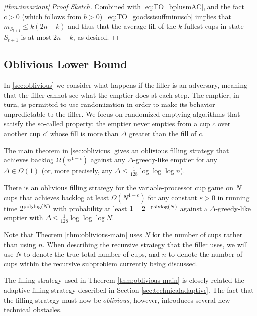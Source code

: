 \begin{proof}[\cref{thm:invariant} Proof Sketch]
Combined with \eqref{eq:TO_bplusmAC}, and the fact $c>0$ (which follows from $b > 0$),
\eqref{eq:TO_goodsstsuffminuscb} implies that $m_{S_{t + 1}} \le k(2n - k)$ and thus that the average fill of
the $k$ fullest cups in state $S_{t+1}$ is at most $2n-k$, as
desired.
\end{proof}
\subsection{Oblivious Lower Bound}

In \cref{sec:oblivious} we consider what happens if the filler is an
 adversary, meaning that the filler cannot see what
the emptier does at each step. The emptier, in turn, is permitted to
use randomization in order to make its behavior unpredictable to the
filler. We focus on randomized emptying algorithms that satisfy the
so-called  property: the emptier never
empties from a cup $c$ over another cup $c'$ whose fill is more than
$\Delta$ greater than the fill of $c$.

The main theorem in \cref{sec:oblivious} gives an oblivious filling
strategy that achieves backlog $\Omega(n^{1 - \epsilon})$ against any
$\Delta$-greedy-like emptier for any $\Delta \in \Omega(1)$ (or, more
precisely, any $\Delta \le \frac{1}{128} \log \log \log n$).

\begin{theorem}
  There is an oblivious filling strategy for the
  variable-processor cup game on $N$ cups that achieves backlog
  at least $\Omega(N^{1-\varepsilon})$ for any constant $\varepsilon
  >0$ in running time $2^{\operatorname{\text{polylog}}(N)}$ with probability at least
  $1-2^{-\operatorname{\text{polylog}}(N)}$ against a $\Delta$-greedy-like emptier
  with $\Delta \le \frac{1}{128} \log\log\log N$.
  \label{thm:oblivious-main}
\end{theorem}

Note that Theorem \ref{thm:oblivious-main} uses $N$ for the number of
cups rather than using $n$. When describing the recursive strategy
that the filler uses, we will use $N$ to denote the true total number
of cups, and $n$ to denote the number of cups within the recursive
subproblem currently being discussed.

The filling strategy used in Theorem \ref{thm:oblivious-main} is
closely related the adaptive filling strategy described in Section
\ref{sec:technicaladaptive}. The fact that the filling strategy must
now be \emph{oblivious}, however, introduces several new technical
obstacles.

